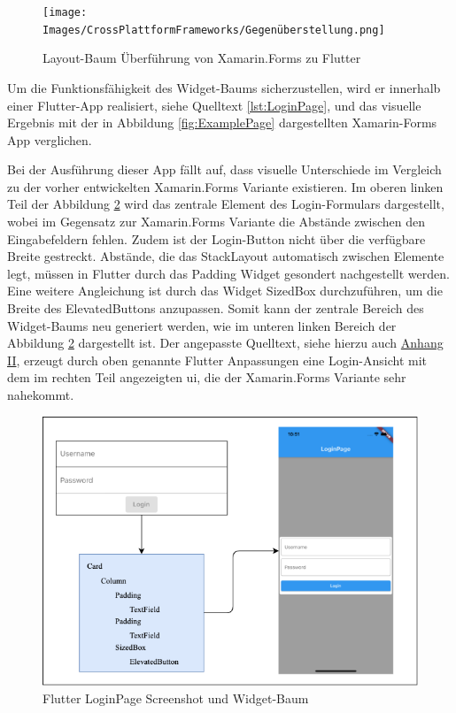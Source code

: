 \begin{figure}[!ht]
 \texttt{[image: Images/CrossPlattformFrameworks/Gegenüberstellung.png]}
 \caption{Layout-Baum Überführung von Xamarin.Forms zu Flutter}
 \label{fig:LayoutTrees}
\end{figure}

Um die Funktionsfähigkeit des Widget-Baums sicherzustellen,  wird er innerhalb einer Flutter-App realisiert, siehe Quelltext \ref{lst:LoginPage}, und das visuelle Ergebnis mit der in Abbildung \ref{fig:ExamplePage} dargestellten Xamarin-Forms App verglichen. 

 

Bei der Ausführung dieser App fällt auf,  dass visuelle Unterschiede im Vergleich zu der vorher entwickelten Xamarin.Forms Variante existieren.  Im oberen linken Teil der Abbildung \ref{fig:LoginPageFlutter} wird das zentrale Element des Login-Formulars dargestellt, wobei im Gegensatz zur Xamarin.Forms Variante die Abstände zwischen den Eingabefeldern fehlen.  Zudem ist der Login-Button nicht über die verfügbare Breite gestreckt.  Abstände, die das \glq StackLayout\grq{} automatisch zwischen Elemente legt,  müssen in Flutter durch das \glq Padding\grq{} Widget gesondert nachgestellt werden.  Eine weitere Angleichung ist durch das Widget \glq SizedBox\grq{} durchzuführen,  um die Breite des \glq ElevatedButtons\grq{} anzupassen.  Somit kann der zentrale Bereich des Widget-Baums neu generiert werden,  wie im unteren linken Bereich der Abbildung \ref{fig:LoginPageFlutter} dargestellt ist.  Der angepasste Quelltext,  siehe hierzu auch  \hyperref[chap:OptimizedLoginPage]{Anhang II},  erzeugt durch oben genannte Flutter Anpassungen eine Login-Ansicht mit dem im rechten Teil angezeigten \ac{ui}, die der Xamarin.Forms Variante sehr nahekommt.

\begin{figure}[!ht]
 \includegraphics[width=\textwidth,height=\textheight,keepaspectratio]{Images/CrossPlattformFrameworks/FlutterLoginPage.png}
 \caption{Flutter LoginPage Screenshot und Widget-Baum}
 \label{fig:LoginPageFlutter}
\end{figure}

